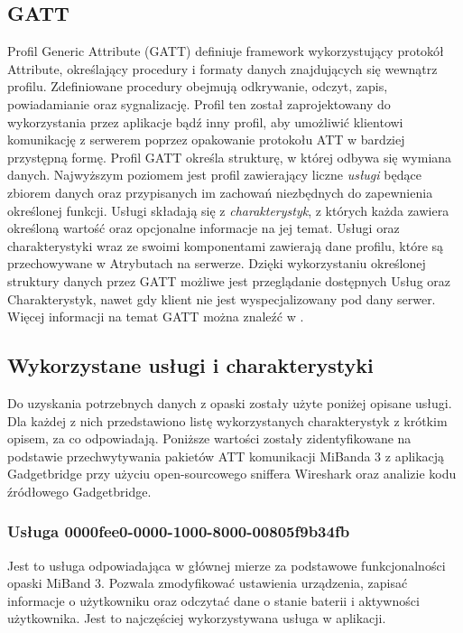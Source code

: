 \subsection{GATT}
Profil Generic Attribute (GATT) definiuje framework wykorzystujący protokół Attribute, określający procedury i formaty danych znajdujących się wewnątrz profilu. Zdefiniowane procedury obejmują odkrywanie, odczyt, zapis, powiadamianie oraz sygnalizację. Profil ten został zaprojektowany do wykorzystania przez aplikacje bądź inny profil, aby umożliwić klientowi komunikację z serwerem poprzez opakowanie protokołu ATT w bardziej przystępną formę.
\newline\newline
\indent Profil GATT określa strukturę, w której odbywa się wymiana danych. Najwyższym poziomem jest profil zawierający liczne \textit{usługi} będące zbiorem danych oraz przypisanych im zachowań niezbędnych do zapewnienia określonej funkcji. Usługi składają się z \textit{charakterystyk}, z których każda zawiera określoną wartość oraz opcjonalne informacje na jej temat. Usługi oraz charakterystyki wraz ze swoimi komponentami zawierają dane profilu, które są przechowywane w Atrybutach na serwerze. Dzięki wykorzystaniu określonej struktury danych przez GATT możliwe jest przeglądanie dostępnych Usług oraz Charakterystyk, nawet gdy klient nie jest wyspecjalizowany pod dany serwer. Więcej informacji na temat GATT można znaleźć w \cite{BT-Corev5.2}.

\subsection{Wykorzystane usługi i charakterystyki}
Do uzyskania potrzebnych danych z opaski zostały użyte poniżej opisane usługi. Dla każdej z nich przedstawiono listę wykorzystanych charakterystyk z krótkim opisem, za co odpowiadają. Poniższe wartości zostały zidentyfikowane na podstawie przechwytywania pakietów ATT komunikacji MiBanda 3 z aplikacją Gadgetbridge \cite{Gadgetbridge} przy użyciu open-sourcowego sniffera Wireshark \cite{Wireshark} oraz analizie kodu źródłowego Gadgetbridge.

\subsubsection{Usługa 0000fee0-0000-1000-8000-00805f9b34fb}
Jest to usługa odpowiadająca w głównej mierze za podstawowe funkcjonalności opaski MiBand 3. Pozwala zmodyfikować ustawienia urządzenia, zapisać informacje o użytkowniku oraz odczytać dane o stanie baterii i aktywności użytkownika. Jest to najczęściej wykorzystywana usługa w aplikacji.

